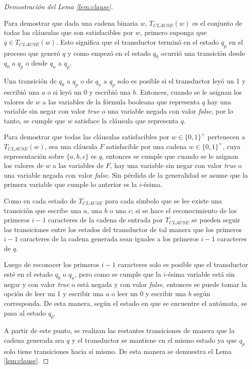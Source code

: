 \documentclass[12pt]{article}
\newcommand{\true}{\textit{true}}
\newcommand{\false}{\textit{false}}
\begin{document}
\begin{proof}[Demostración del Lema \ref{lem:clause}] \
    
    Para demostrar que dada una cadena binaria $w$, $T_{CLAUSE}(w)$ es el conjunto de todas las cláusulas que 
    son satisfacibles por $w$, primero suponga que $q\in T_{CLAUSE}(w)$.  Esto significa que el transductor 
    terminó en el estado $q_p$ en el proceso que generó $q$ y como empezó en el estado $q_0$ ocurrió una 
    transición desde $q_0$ a $q_p$ o desde $q_n$ a $q_p$. 
    
    Una transición de $q_0$ a $q_p$ o de $q_n$ a $q_p$ solo es posible si el transductor leyó un 1 y 
    escribió una $a$ o si leyó un 0 y escribió una $b$. Entonces, cuando se le asignan los valores de 
    $w$ a las variables de la fórmula booleana que representa $q$ hay una variable sin negar con valor 
    \true{} o una variable negada con valor \false{}, por lo tanto, se cumple que $w$ satisface la cláusula 
    que representa $q$. 
    
    Para demostrar que todas las cláusulas satisfacibles por $w\in\{0,1\}^+$ pertenecen a $T_{CLAUSE}(w)$, sea una cláusula $F$ satisfacible por una cadena $w\in\{0,1\}^+$, cuya representación sobre $\{a,b,c\}$ es $q$, entonces se cumple que cuando se le asignan los valores de $w$ a las variables de $F$, hay una variable sin negar con valor \true{} o una variable negada con valor \false{}. Sin pérdida de la generalidad se asume que la primera variable que cumple lo anterior es la $i$-ésima.
    
    Como en cada estado de $T_{CLAUSE}$ para cada símbolo que se lee existe una transición que escribe una $a$, una $b$ o una $c$; si se hace el reconocimiento de los primeros $i-1$ caracteres de la cadena de entrada por $T_{CLAUSE}$ se pueden seguir las transiciones entre los estados del transductor de tal manera que los primeros $i-1$ caracteres de la cadena generada sean iguales a los primeros $i-1$ caracteres de $q$.
    
    Luego de reconocer los primeros $i-1$ caracteres solo es posible que el transductor esté en el estado $q_0$ o $q_n$, pero como se cumple que la $i$-ésima variable está sin negar y con valor \true{} o está negada y con valor \false{}, entonces se puede tomar la opción de leer un 1 y escribir una $a$ o leer un 0 y escribir una $b$ según corresponda.  De esta manera, según el estado en que se encuentre el autómata, se pasa al estado $q_p$.
    
    A partir de este punto, se realizan las restantes transiciones de manera que la cadena generada sea $q$ y el transductor se mantiene en el mismo estado ya que $q_p$ solo tiene transiciones hacia sí mismo. De esta manera se demuestra el Lema \ref{lem:clause}. 
\end{proof}
\end{document}
